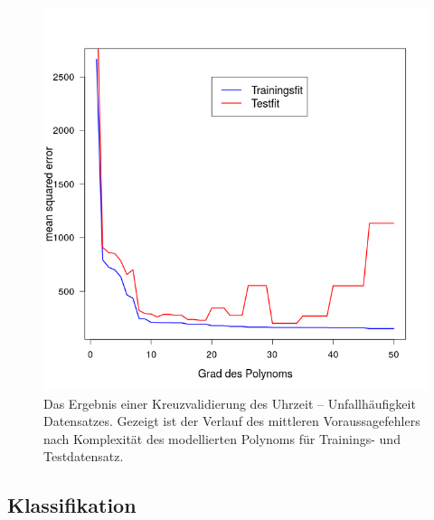 \begin{figure}[!ht]
  \caption{Das Ergebnis einer Kreuzvalidierung des Uhrzeit -- Unfallhäufigkeit
           Datensatzes. Gezeigt ist der Verlauf des mittleren Voraussagefehlers nach Komplexität
           des modellierten Polynoms für Trainings- und Testdatensatz.}  \centering
  \includegraphics[width=1\textwidth]{chapters/svm/test_training.png}
\end{figure}

\subsection{Klassifikation}


